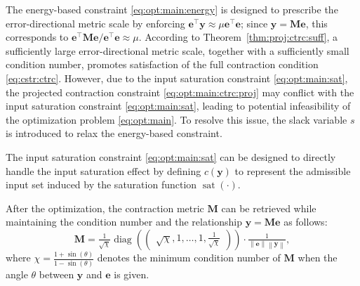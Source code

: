 \documentclass{ifacconf}
\newcommand*{\mv}[1]{\boldsymbol{#1}} %
\newcommand*{\mm}[1]{\boldsymbol{#1}} %
\newcommand*{\norm}[1]{\left\lVert #1 \right\rVert} %
\DeclareMathOperator{\mysat}{{sat}}       %
\DeclareMathOperator{\mydiag}{{diag}}     %
\begin{document}
The energy-based constraint \eqref{eq:opt:main:energy} is designed to prescribe the error-directional metric scale by enforcing 
$\mv e^\top\mv y\approx\mu\mv e^\top\mv e$; since $\mv y=\mm M\mv e$, this corresponds to 
$\mv e^\top\mm M\mv e/\mv e^\top\mv e\approx\mu$.
According to Theorem~\ref{thm:proj:ctrc:suff}, a sufficiently large error-directional metric scale, together with a sufficiently small condition number, promotes satisfaction of the full contraction condition \eqref{eq:cstr:ctrc}.
However, due to the input saturation constraint \eqref{eq:opt:main:sat}, the projected contraction constraint \eqref{eq:opt:main:ctrc:proj} may conflict with the input saturation constraint \eqref{eq:opt:main:sat}, leading to potential infeasibility of the optimization problem \eqref{eq:opt:main}.
To resolve this issue, the slack variable $s$ is introduced to relax the energy-based constraint.

The input saturation constraint \eqref{eq:opt:main:sat} can be designed to directly handle the input saturation effect by defining $c(\mv{y})$ to represent the admissible input set induced by the saturation function $\mysat(\cdot)$.

After the optimization, the contraction metric $\mm{M}$ can be retrieved while maintaining the condition number and the relationship $\mv{y}=\mm{M}\mv{e}$ as follows:
\begin{equation} \label{eq:retrive:mm}
   \mm{M}
   =
   \tfrac{1}{\sqrt{\chi}}
   \mydiag
   \left(
      \begin{pmatrix}
         \sqrt{\chi}, 1, \ldots, 1, \tfrac{1}{\sqrt{\chi}}
      \end{pmatrix}
   \right)
   \cdot
   \tfrac{1}{\norm{\mv{e}}\norm{\mv{y}}}
   ,
\end{equation}
where $\chi=\tfrac{1+\sin(\theta)}{1-\sin(\theta)}$ denotes the minimum condition number of $\mm{M}$ when the angle $\theta$ between $\mv{y}$ and $\mv{e}$ is given.

\end{document}
